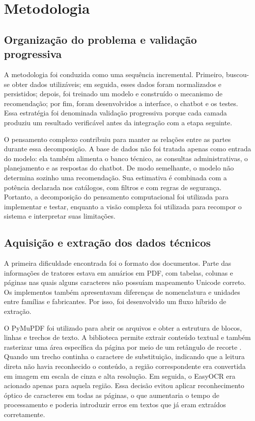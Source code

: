 \documentclass[12pt,a4paper]{article}
\begin{document}
\section{Metodologia}

\subsection{Organização do problema e validação progressiva}

A metodologia foi conduzida como uma sequência incremental. Primeiro, buscou-se obter dados utilizáveis; em seguida, esses dados foram normalizados e persistidos; depois, foi treinado um modelo e construído o mecanismo de recomendação; por fim, foram desenvolvidos a interface, o chatbot e os testes. Essa estratégia foi denominada validação progressiva porque cada camada produziu um resultado verificável antes da integração com a etapa seguinte.

O pensamento complexo contribuiu para manter as relações entre as partes durante essa decomposição. A base de dados não foi tratada apenas como entrada do modelo: ela também alimenta o banco técnico, as consultas administrativas, o planejamento e as respostas do chatbot. De modo semelhante, o modelo não determina sozinho uma recomendação. Sua estimativa é combinada com a potência declarada nos catálogos, com filtros e com regras de segurança. Portanto, a decomposição do pensamento computacional foi utilizada para implementar e testar, enquanto a visão complexa foi utilizada para recompor o sistema e interpretar suas limitações.

\subsection{Aquisição e extração dos dados técnicos}

A primeira dificuldade encontrada foi o formato dos documentos. Parte das informações de tratores estava em anuários em PDF, com tabelas, colunas e páginas nas quais alguns caracteres não possuíam mapeamento Unicode correto. Os implementos também apresentavam diferenças de nomenclatura e unidades entre famílias e fabricantes. Por isso, foi desenvolvido um fluxo híbrido de extração.

O PyMuPDF foi utilizado para abrir os arquivos e obter a estrutura de blocos, linhas e trechos de texto. A biblioteca permite extrair conteúdo textual e também rasterizar uma área específica da página por meio de um retângulo de recorte \cite{pymupdf_text,pymupdf_ocr}. Quando um trecho continha o caractere de substituição, indicando que a leitura direta não havia reconhecido o conteúdo, a região correspondente era convertida em imagem em escala de cinza e alta resolução. Em seguida, o EasyOCR era acionado apenas para aquela região. Essa decisão evitou aplicar reconhecimento óptico de caracteres em todas as páginas, o que aumentaria o tempo de processamento e poderia introduzir erros em textos que já eram extraídos corretamente.
\end{document}
